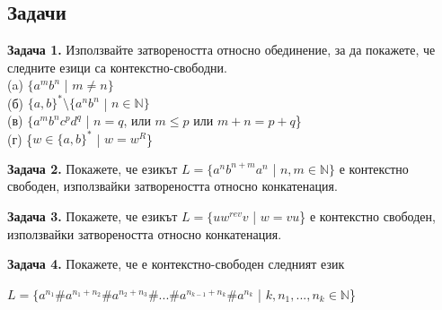 \documentclass[openany]{book}
\begin{document}
\subsection{Задачи}
    \textbf{Задача 1.} Използвайте затвореността относно обединение, за да покажете, че 
    следните езици са контекстно-свободни. \\
    (a) $\{a^mb^n$ | $m \neq n\}$ \\
    (б) $\{a,b\}^* \setminus \{a^nb^n$ | $n \in \mathbb{N}\}$ \\
    (в) $\{a^mb^nc^pd^q$ | $n = q$, или $m \leq p$ или $m+n = p+q$\} \\
    (г) \{$w \in \{a,b\}^*$ | $w = w^R$\}

    \vspace{15pt}

    \textbf{Задача 2.} Покажете, че езикът $L = \{a^nb^{n+m}a^n$ | $n,m \in \mathbb{N}\}$ е контекстно свободен,
    използвайки затвореността относно конкатенация.

    \vspace{15pt}

    \textbf{Задача 3.} Покажете, че езикът $L = \{uw^{rev}v$ | $w = vu$\} е контекстно
    свободен, използвайки затвореността относно конкатенация.

    \vspace{15pt}

    \textbf{Задача 4.} Покажете, че е контекстно-свободен следният език \\
    \begin{center}
        $L = \{a^{n_1}\#a^{n_1+n_2}\#a^{n_2+n_3}\#...\#a^{n_{k-1} + n_k}\#a^{n_k}$ | $k,n_1,...,n_k \in \mathbb{N}$\}
    \end{center}

\vspace{25pt}
\end{document}
